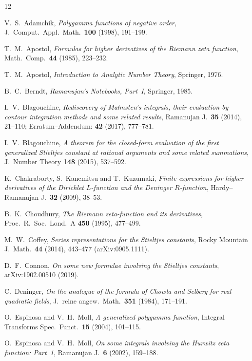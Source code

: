 \documentclass[11pt]{article}
\theoremstyle{remark}
\begin{document}
\begin{thebibliography}{12}

V.~S.~Adamchik, \emph{Polygamma functions of negative order}, J.~Comput.\
Appl.\ Math.\ \textbf{100} (1998), 191--199.

T.~M.~Apostol, \emph{Formulas for higher derivatives of the Riemann zeta
function}, Math.\ Comp.\ \textbf{44} (1985), 223--232.

T.~M.~Apostol, \emph{Introduction to Analytic Number Theory},
Springer, 1976.

B.~C.~Berndt, \emph{Ramanujan's Notebooks, Part~I}, Springer, 1985.

I.~V.~Blagouchine, \emph{Rediscovery of Malmsten's integrals, their
evaluation by contour integration methods and some related results},
Ramanujan J.\ \textbf{35} (2014), 21--110; Erratum--Addendum:
\textbf{42} (2017), 777--781.

I.~V.~Blagouchine, \emph{A theorem for the closed-form evaluation of the
first generalized Stieltjes constant at rational arguments and some related
summations}, J.~Number Theory \textbf{148} (2015), 537--592.

K.~Chakraborty, S.~Kanemitsu and T.~Kuzumaki, \emph{Finite expressions for
higher derivatives of the Dirichlet $L$-function and the Deninger
$R$-function}, Hardy--Ramanujan J.\ \textbf{32} (2009), 38--53.

B.~K.~Choudhury, \emph{The Riemann zeta-function and its derivatives},
Proc.\ R.\ Soc.\ Lond.\ A \textbf{450} (1995), 477--499.

M.~W.~Coffey, \emph{Series representations for the Stieltjes constants},
Rocky Mountain J.\ Math.\ \textbf{44} (2014), 443--477
(arXiv:0905.1111).

D.~F.~Connon, \emph{On some new formulae involving the Stieltjes constants},
arXiv:1902.00510 (2019).

C.~Deninger, \emph{On the analogue of the formula of Chowla and Selberg for
real quadratic fields}, J.~reine angew.\ Math.\ \textbf{351} (1984),
171--191.

O.~Espinosa and V.~H.~Moll, \emph{A generalized polygamma function},
Integral Transforms Spec.\ Funct.\ \textbf{15} (2004), 101--115.

O.~Espinosa and V.~H.~Moll, \emph{On some integrals involving the Hurwitz
zeta function: Part~1}, Ramanujan J.\ \textbf{6} (2002), 159--188.


\end{thebibliography}
\end{document}

